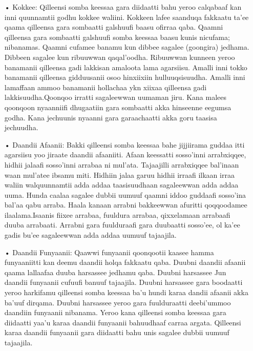 \documentclass[11pt,b5paper]{book}
\begin{document}
\begin{itemize}
\item[•]Kokkee: Qilleensi somba keessaa gara diidaatti bahu yeroo calqabaaf kan inni quunnamtii godhu kokkee waliini. Kokkeen lafee saanduqa fakkaatu ta’ee qaama qilleensa gara sombaatti
galshuufi baasu ofirraa qaba. Qaamni qilleensa gara sombaatti galshuufi somba keessaa baasu kunis nicufama; nibanamas. Qaamni cufamee banamu kun dibbee sagalee (goongira)
jedhama. Dibbeen sagalee kun ribuuwwan qaqal’oodha. Ribuuwwan kunneen yeroo banamanii qilleensa gadi lakkisan amaloota lama agarsiisu. Amalli inni tokko banamanii qilleensa
gidduusanii osoo hinxiixiin hulluuqsisuudha. Amalli inni lamaffaan ammoo banamanii hollachaa ykn xiixaa qilleensa gadi lakkisuudha.Qoonqoo irratti sagaleewwan uumaman jiru. Kana
malees qoonqoon nyaanniifi dhugaatiin gara sombaatti akka hinseenne eegumsa godha. Kana jechuunis nyaanni gara garaachaatti akka goru taasisa jechuudha.

\item[•] Daandii Afaanii: Bakki qilleensi somba keessaa bahe jijjiirama guddaa itti agarsiisu yoo jiraate daandii afaaniiti. Afaan keessatti sosso’inni arrabxiqqee, hidhii jalaafi sosso’inni
arrabaa ni mul’ata. Tajaajilli arrabxiqqee bal’inaan waan mul’atee ibsamu miti. Hidhiin jalaa garuu hidhii irraafi ilkaan irraa waliin walquunnamtii adda addaa taasisuudhaan
sagaleewwan adda addaa uuma. Hunda caalaa sagalee dubbii uumuuf qaamni iddoo guddaafi sosso’ina bal’aa qabu arraba. Haala kanaan arrabni bakkeewwan afuritti qoqqoodamee
ilaalama.Isaanis fiixee arrabaa, fuuldura arrabaa, qixxelamaan arrabaafi duuba arrabaati. Arrabni gara fuulduraafi gara duubaatti sosso’ee, ol ka’ee gadis bu’ee sagaleewwan adda
addaa uumuuf tajaajila.

\item[•] Daandii Funyaanii: Qaawwi funyaanii qoonqootii kaasee hamma funyaaniitti kan deemu daandii holqa fakkaatu qaba. Duubni daandii afaanii qaama lallaafaa duuba harsassee
jedhamu qaba. Duubni harsassee Jun daandii funyaanii cufuufi banuuf tajaajila. Duubni harsassee gara boodaatti yeroo harkifamu qilleensi somba keessaa ba’u hundi karaa dandii
afaanii akka ba’uuf dirqama. Duubni harsassee yeroo gara fuulduraatti deebi’ummoo daandiin funyaanii nibanama. Yeroo kana qilleensi somba keessaa gara diidaatti yaa’u karaa daandii
funyaanii bahuudhaaf carraa argata. Qilleensi karaa daandii funyaanii gara diidaatti bahu unis sagalee dubbii uumuuf tajaajila.

\end{itemize}
\end{document}
